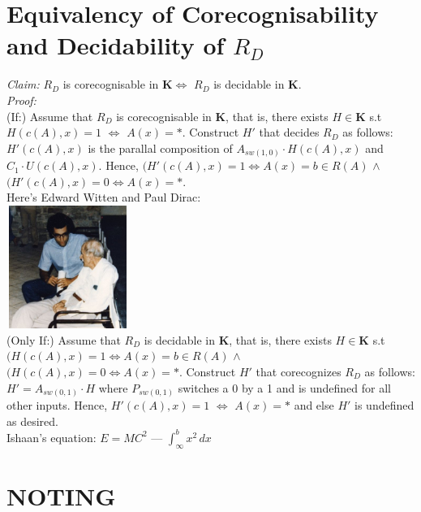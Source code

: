 \documentclass{article}
\newcommand{\K}{$\bm{K}$}
\begin{document}
\section{Equivalency of Corecognisability and Decidability of $R_D$}
\textit{Claim:} $R_D$ is corecognisable in \K{}$\iff{}$ $R_D$ is decidable in \K{}.\\

\noindent{}\textit{Proof:}\\
(If:) Assume that $R_D$ is corecognisable in \K{}, that is, there exists $H\in{}\bm{K}$ s.t $H(c(A), x)=1$ $\iff{}$ $A(x)=*$. Construct $H'$ that decides $R_D$ as follows: $H'(c(A),x)$ is the parallal composition of $A_{sw(1,0)}\cdot{}H(c(A),x)$ and $C_1 \cdot{} U(c(A),x)$. Hence, $(H'(c(A),x)=1\iff{}A(x)=b\in{}R(A)$ $\wedge{}$ $(H'(c(A),x)=0\iff{}A(x)=*$.\\

Here's Edward Witten and Paul Dirac: \\

\includegraphics[width=4cm, height=4cm]{wittenDirac.jpg}\\

\noindent{}(Only If:) Assume that $R_D$ is decidable in \K{}, that is, there exists $H\in{}\bm{K}$ s.t $(H(c(A),x)=1\iff{}A(x)=b\in{}R(A)$ $\wedge{}$ $(H(c(A),x)=0\iff{}A(x)=*$. Construct $H'$ that corecognizes $R_D$ as follows: $H'=A_{sw(0,1)}\cdot{}H$ where $P_{sw(0,1)}$ switches a 0 by a 1 and is undefined for all other inputs. Hence, $H'(c(A), x)=1$ $\iff{}$ $A(x)=*$ and else $H'$ is undefined as desired.  \\

Ishaan's equation: $E=MC^2$ --- $\int_{\infty{}}^{b} x^2 \,dx$

\section{NOTING}
\end{document}
